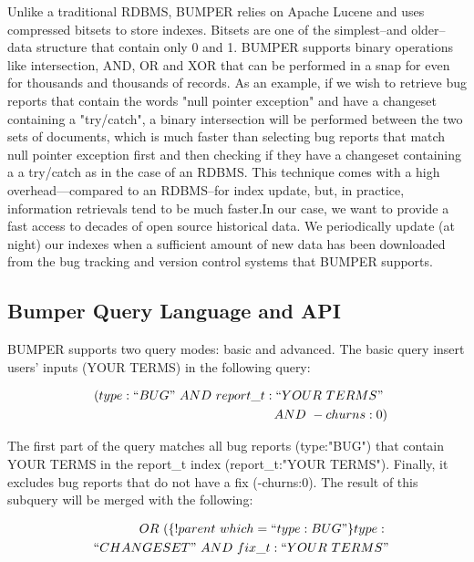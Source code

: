 \documentclass[conference]{IEEEtran}
\begin{document}
Unlike a traditional RDBMS, BUMPER relies on Apache Lucene and uses compressed bitsets to store indexes.
Bitsets are one of the simplest--and older--data structure that contain only 0 and 1.
BUMPER supports binary operations like intersection, AND, OR and XOR that can be performed in a snap for even for thousands and thousands of records.
As an example, if we wish to retrieve bug reports that contain the words "null pointer exception" and have a changeset containing a "try/catch", a binary intersection will be performed between the two sets of documents, which is much faster than selecting bug reports that match null pointer exception first and then checking if they have a changeset containing a a try/catch as in the case of an RDBMS.
This technique comes with a high overhead—compared to an RDBMS--for index update, but, in practice, information retrievals tend to be much faster.In our case, we want to provide a fast access to decades of open source historical data. We periodically update (at night) our indexes when a sufficient amount of new data has been downloaded from the bug tracking and version control systems that BUMPER supports.

\subsection{Bumper Query Language and API}
\label{sub:Bumper Query Language and API}

BUMPER supports two query modes: basic and advanced.
The basic query insert users' inputs (YOUR TERMS) in the
following query:

\begin{equation*}
\begin{split}
~~(type:``BUG"~AND~report\_t:``YOUR~TERMS"~\\
~~AND~-churns:0)
\end{split}
\end{equation*}



The first part of the query matches all bug reports
(type:"BUG") that contain YOUR TERMS in the report\_t index
(report\_t:"YOUR TERMS").
Finally, it excludes bug reports that
do not have a fix (-churns:0).
The result of this subquery will be
merged with the following:

\begin{equation*}
\begin{split}
~~OR~(\{!parent~which=``type:BUG"\}type:~\\
~~``CHANGESET"~AND~fix\_t:``YOUR~TERMS"
\end{split}
\end{equation*}
\end{document}
